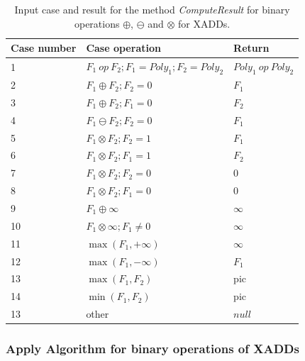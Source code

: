 \documentclass[twoside,11pt]{article}
\begin{document}
\begin{table}[!h]
\begin{center}
    \begin{tabular}{|l|l|l|}
	 \hline
	 Case number&Case operation & Return \\ \hline \hline
1&         $F_1\ \mathit{op}\ F_2; F_1=\mathit{Poly}_1; F_2=\mathit{Poly}_2$ & $\mathit{Poly}_1\ \mathit{op}\ \mathit{Poly}_2$ \\
	 \hline
2&          $F_1  \oplus F_2; F_2=0$ & $F_1$\\
	 \hline
3&          $F_1  \oplus F_2; F_1=0$ & $F_2$\\
	 \hline
4&         $F_1  \ominus F_2; F_2=0$ & $F_1$\\
	 \hline
5&         $F_1  \otimes F_2; F_2=1$ & $F_1$\\
	 \hline
6&          $F_1  \otimes F_2; F_1=1$ & $F_2$\\
	 \hline
7&         $F_1  \otimes F_2; F_2=0$ & 0\\
	 \hline
8&          $F_1  \otimes F_2; F_1=0$ &0\\
	 \hline
9&          $F_1  \oplus \infty $ & $\infty$\\
	 \hline
10&          $F_1  \otimes \infty ; F_1 \neq 0$ & $\infty$\\
	 \hline
11&          $\max (F_1  , +\infty)$ & $\infty$\\
	 \hline
12&          $\max (F_1, -\infty)$ & $F_1$\\
	 \hline
13&          $\max (F_1  , F_2)$ &pic\\
	 \hline
14&          $\min (F_1, F_2)$ &pic\\
	 \hline
13&	  other& $\mathit{null}$\\
         \hline
    \end{tabular}
  \caption{Input case and result for the method \emph{ComputeResult}
  for binary operations  $\oplus$,  $\ominus$ and $\otimes$ for XADDs.
  }
  \label{tab:ComputeResultXADD}
\end{center}
\vspace{-10mm}
\end{table}
\subsubsection{Apply Algorithm for binary operations of XADDs}
\end{document}
